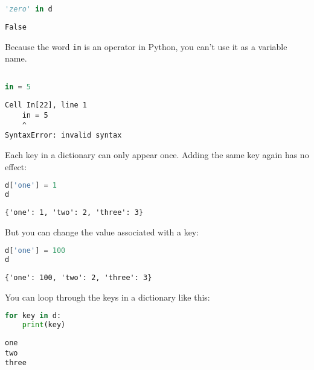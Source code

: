 \begin{lstlisting}[language=Python,style=source]
'zero' in d
\end{lstlisting}

\begin{lstlisting}[style=output]
False
\end{lstlisting}

Because the word \passthrough{\lstinline!in!} is an operator in Python,
you can't use it as a variable name.

\begin{lstlisting}[language=Python,style=source]
%%expect SyntaxError

in = 5
\end{lstlisting}

\begin{lstlisting}[style=output]
  Cell In[22], line 1
    in = 5
    ^
SyntaxError: invalid syntax
\end{lstlisting}

Each key in a dictionary can only appear once. Adding the same key again
has no effect:

\begin{lstlisting}[language=Python,style=source]
d['one'] = 1
d
\end{lstlisting}

\begin{lstlisting}[style=output]
{'one': 1, 'two': 2, 'three': 3}
\end{lstlisting}

\pagebreak

But you can change the value associated with a key:

\begin{lstlisting}[language=Python,style=source]
d['one'] = 100
d
\end{lstlisting}

\begin{lstlisting}[style=output]
{'one': 100, 'two': 2, 'three': 3}
\end{lstlisting}

You can loop through the keys in a dictionary like this:

\begin{lstlisting}[language=Python,style=source]
for key in d:
    print(key)
\end{lstlisting}

\begin{lstlisting}[style=output]
one
two
three
\end{lstlisting}

